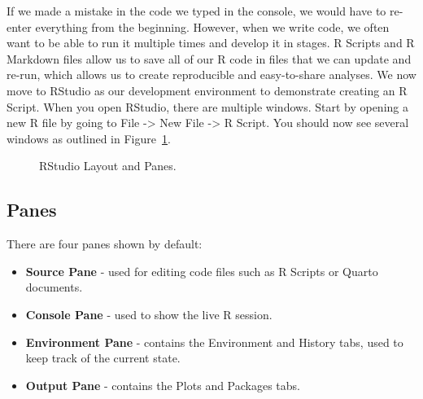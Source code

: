 \documentclass[
  letterpaper,
]{latex/krantz}
\begin{document}
If we made a mistake in the code we typed in the console, we would have
to re-enter everything from the beginning. However, when we write code,
we often want to be able to run it multiple times and develop it in
stages. R Scripts  and R Markdown 
files allow us to save all of our R code in files that we can update and
re-run, which allows us to create reproducible and easy-to-share
analyses. We now move to RStudio 
as our development environment to demonstrate creating an R Script. When
you open RStudio, there are multiple windows. Start by opening a new R
file by going to File -\textgreater{} New File -\textgreater{} R Script.
You should now see several windows as outlined in
Figure~\ref{fig-rstudio}.

\begin{figure}


\caption{\label{fig-rstudio}RStudio Layout and Panes.}

\end{figure}%

\subsection{Panes}\label{panes}

There are four panes shown by default:

\begin{itemize}
\item
  \textbf{Source Pane} - used for editing code files such as R Scripts
  or Quarto documents.
\item
  \textbf{Console Pane} - used to show the live R session.
\item
  \textbf{Environment Pane} - contains the Environment and History tabs,
  used to keep track of the current state.
\item
  \textbf{Output Pane} - contains the Plots and Packages tabs.
\end{itemize}
\end{document}
